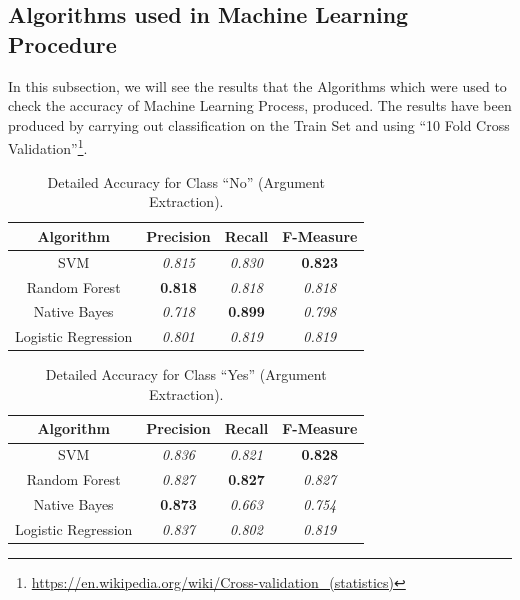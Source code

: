 \subsection{Algorithms used in Machine Learning Procedure}\label{412_ref}
In this subsection, we will see the results that the Algorithms which were used to check the accuracy of Machine Learning Process, produced. The results have been produced by carrying out classification on the Train Set and using ``10 Fold Cross Validation''\footnote{\url{https://en.wikipedia.org/wiki/Cross-validation_(statistics)}}.

\begin{table}[H]
\centering
\caption{Detailed Accuracy for Class “No” (Argument Extraction).}
\label{41_table_ref}
\begin{tabular}{cccc}
\hline
{\bf Algorithm}     & {\bf Precision} & {\bf Recall}    & {\bf F-Measure} \\ \hline
SVM                 & {\it 0.815}     & {\it 0.830}     & {\bf 0.823} \\
Random Forest       & {\bf 0.818} 	 & {\it 0.818}     & {\it 0.818}     \\
Native Bayes        & {\it 0.718}     & {\bf 0.899}     & {\it 0.798}     \\
Logistic Regression & {\it 0.801}     & {\it 0.819}     & {\it 0.819}     \\ \hline
\end{tabular}
\end{table}

\begin{table}[H]
\centering
\caption{Detailed Accuracy for Class “Yes” (Argument Extraction).}
\label{42_table_ref}
\begin{tabular}{cccc}
\hline
{\bf Algorithm}     & {\bf Precision} & {\bf Recall}    & {\bf F-Measure} \\ \hline
SVM                 & {\it 0.836}     & {\it 0.821}     & {\bf 0.828} \\
Random Forest       & {\it 0.827}     & {\bf 0.827}	   & {\it 0.827}     \\
Native Bayes        & {\bf 0.873} 	 & {\it 0.663}     & {\it 0.754}     \\
Logistic Regression & {\it 0.837}     & {\it 0.802}     & {\it 0.819}     \\ \hline
\end{tabular}
\end{table}

